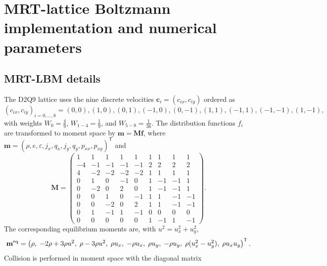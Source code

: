 \section{MRT-lattice Boltzmann implementation and numerical parameters}
\label{suppsec:lbm}

\subsection{MRT-LBM details}
\label{suppsec:mrt-details}

The D2Q9 lattice uses the nine discrete velocities $\mathbf{c}_i=(c_{ix},c_{iy})$ ordered as
\begin{equation}
(c_{ix},c_{iy})_{i=0,\dots,8}
=(0,0),(1,0),(0,1),(-1,0),(0,-1),(1,1),(-1,1),(-1,-1),(1,-1),
\end{equation}
with weights $W_0=\tfrac49$, $W_{1-4}=\tfrac19$, and $W_{5-8}=\tfrac1{36}$. The distribution functions $f_i$ are transformed to moment space by $\mathbf{m}=\mathbf{M}\mathbf{f}$, where $\mathbf{m}=(\rho,e,\varepsilon,j_x,q_x,j_y,q_y,p_{xx},p_{xy})^{\mathsf T}$ and
\begin{equation}
\mathbf{M}=
\begin{pmatrix}
 1 &  1 &  1 &  1 &  1 &  1 &  1 &  1 &  1\\
-4 & -1 & -1 & -1 & -1 &  2 &  2 &  2 &  2\\
 4 & -2 & -2 & -2 & -2 &  1 &  1 &  1 &  1\\
 0 &  1 &  0 & -1 &  0 &  1 & -1 & -1 &  1\\
 0 & -2 &  0 &  2 &  0 &  1 & -1 & -1 &  1\\
 0 &  0 &  1 &  0 & -1 &  1 &  1 & -1 & -1\\
 0 &  0 & -2 &  0 &  2 &  1 &  1 & -1 & -1\\
 0 &  1 & -1 &  1 & -1 &  0 &  0 &  0 &  0\\
 0 &  0 &  0 &  0 &  0 &  1 & -1 &  1 & -1
\end{pmatrix}.
\label{eq:Mmatrix}
\end{equation}
The corresponding equilibrium moments are, with $u^2=u_x^2+u_y^2$,
\begin{equation}
\mathbf{m}^{\rm eq}=
\begin{pmatrix}
\rho,\;-2\rho+3\rho u^2,\;\rho-3\rho u^2,\;\rho u_x,\;-\rho u_x,\;\rho u_y,\;-\rho u_y,\;\rho(u_x^2-u_y^2),\;\rho u_xu_y
\end{pmatrix}^{\mathsf T}.
\label{eq:meq}
\end{equation}
Collision is performed in moment space with the diagonal matrix
